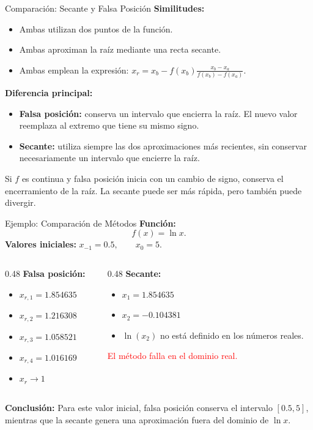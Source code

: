 \documentclass[../../main.tex]{subfiles}
\begin{document}
\begin{frame}{Comparación: Secante y Falsa Posición}
\textbf{Similitudes:}
\begin{itemize}
  \item Ambas utilizan dos puntos de la función.
  \item Ambas aproximan la raíz mediante una recta secante.
  \item Ambas emplean la expresión:
  \(
  x_r
  =
  x_b
  -
  f(x_b)
  \frac{x_b-x_a}{f(x_b)-f(x_a)}.
  \)
\end{itemize}
\textbf{Diferencia principal:}
\begin{itemize}
  \item \textbf{Falsa posición:}
  conserva un intervalo que encierra la raíz. El nuevo valor reemplaza
  al extremo que tiene su mismo signo.
  \item \textbf{Secante:}
  utiliza siempre las dos aproximaciones más recientes, sin conservar
  necesariamente un intervalo que encierre la raíz.
\end{itemize}
Si \(f\) es continua y falsa posición inicia con un cambio de signo,
conserva el encerramiento de la raíz. La secante puede ser más rápida,
pero también puede divergir.

\end{frame}



\begin{frame}{Ejemplo: Comparación de Métodos}
\textbf{Función:}
\[
f(x)=\ln x.
\]
\textbf{Valores iniciales:}
\(
x_{-1}=0.5,
\qquad
x_0=5.
\)
\begin{columns}[T]
\begin{column}{0.48\textwidth}
\textbf{Falsa posición:}
\begin{itemize}
  \item \(x_{r,1}=1.854635\)
  \item \(x_{r,2}=1.216308\)
  \item \(x_{r,3}=1.058521\)
  \item \(x_{r,4}=1.016169\)
  \item \(x_r\longrightarrow1\)
\end{itemize}
\end{column}
\begin{column}{0.48\textwidth}
\textbf{Secante:}
\begin{itemize}
  \item \(x_1=1.854635\)
  \item \(x_2=-0.104381\)
  \item \(\ln(x_2)\) no está definido
        en los números reales.
\end{itemize}

\textcolor{red}{El método falla en el dominio real.}
\end{column}
\end{columns}
\textbf{Conclusión:}
Para este valor inicial, falsa posición conserva el intervalo
\([0.5,5]\), mientras que la secante genera una aproximación fuera
del dominio de \(\ln x\).

\end{frame}
\end{document}
